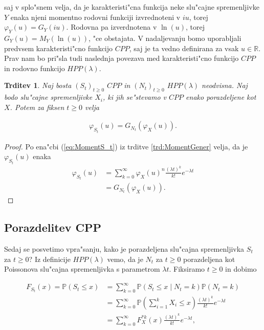 \documentclass[12pt, a4paper, reqno]{amsart}
\theoremstyle{definition} %
\theoremstyle{plain} %
\newtheorem{trditev}[definicija]{Trditev}
\newcommand{\R}{\mathbb{R}}
\newcommand{\Prob}{\mathbb{P}}
\newcommand{\1}{\mathds{1}}
\begin{document}
    \noindent
    saj v splo"snem velja, da je karakteristi"cna funkcija neke slu"cajne spremenljivke $Y$ enaka
    njeni momentno rodovni funkciji izvrednoteni v $iu$, torej $\varphi_Y(u) = G_Y(iu)$. Rodovna pa 
    izverdnotena v $\ln(u)$, torej $G_Y(u) = M_Y(\ln(u))$, "ce obstajata.
    V nadaljevanju bomo uporabljali predvsem karakteristi"cno funkcijo $CPP$, saj je ta vedno definirana 
    za vsak $u\in\R$. Prav nam bo pri"sla tudi naslednja povezava med karakteristi"cno funkcijo $CPP$ 
    in rodovno funkcijo $HPP(\lambda)$.
    \begin{trditev}
        Naj bosta $(S_t)_{t\geq0}$ $CPP$ in $(N_t)_{t\geq0}$ $HPP(\lambda)$ neodvisna. 
        Naj bodo slu"cajne spremenljivke $X_i$, ki jih se"stevamo v $CPP$ enako porazdeljene kot $X$. 
        Potem za fiksen $t\geq0$ velja

        \begin{align*}
            \varphi_{S_t}(u) = G_{N_t}\left(\varphi_{X}(u)\right).
        \end{align*}

        \label{trd:povezavaRodovneKarkateristicne}
    \end{trditev}

    \begin{proof}
        Po ena"cbi (\ref{eq:MomentS_t}) iz trditve \ref{trd:MomentGener} velja, da je $\varphi_{S_t}(u)$ enaka
        \begin{align*}
            \varphi_{S_t}(u) &= \sum_{k=0}^{\infty}
            \varphi_X(u)^n\frac{(\lambda t)^k}{k!}e^{-\lambda t} \\
            &= G_{N_t}\left(\varphi_X(u)\right).
        \end{align*}
    \end{proof}

    \subsection{Porazdelitev CPP}
    Sedaj se posvetimo vpra"sanju, kako je porazdeljena slu"cajna spremenljivka $S_t$ za $t\geq 0$? 
    Iz definicije $HPP(\lambda)$ vemo, da je $N_t$ za $t\geq0$ porazdeljena kot Poissonova slu"cajna 
    spremenljivka s parametrom $\lambda t$. Fiksiramo $t\geq0$ in dobimo 

    \begin{align*}
        F_{S_t}(x) = \Prob(S_t \leq x) 
        &= \sum_{k=0}^\infty \Prob(S_t \leq x \mid N_t = k)\Prob(N_t = k) \\
        & = \sum_{k=0}^\infty \Prob(\sum_{i=1}^k X_i \leq x)\frac{(\lambda t)^k}{k!}e^{-\lambda t} \\
        & = \sum_{k=0}^\infty F_X^{*k}(x)\frac{(\lambda t)^k}{k!}e^{-\lambda t}, \\
    \end{align*}
\end{document}
